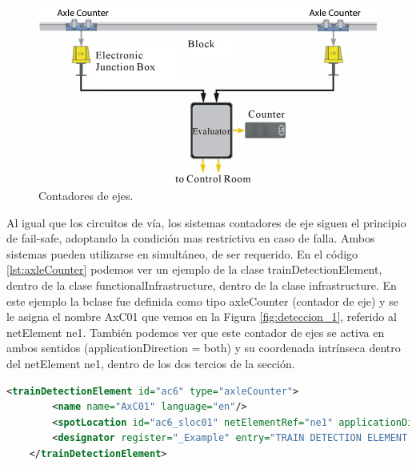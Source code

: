     \begin{figure}[H]
        \centering
        \includegraphics[width=1\textwidth]{Figuras/contador.jpg}
        \centering\caption{Contadores de ejes.}
        \label{fig:deteccion_2}
    \end{figure}

    Al igual que los circuitos de vía, los sistemas contadores de eje siguen el principio de fail-safe, adoptando la condición mas restrictiva en caso de falla. Ambos sistemas pueden utilizarse en simultáneo, de ser requerido. En el código \ref{lst:axleCounter} podemos ver un ejemplo de la clase trainDetectionElement, dentro de la clase functionalInfrastructure, dentro de la clase infrastructure. En este ejemplo la bclase fue definida como tipo axleCounter (contador de eje) y se le asigna el nombre AxC01 que vemos en la Figura \ref{fig:deteccion_1}, referido al netElement ne1. También podemos ver que este contador de ejes se activa en ambos sentidos (applicationDirection = both) y su coordenada intrínseca dentro del netElement ne1, dentro de los dos tercios de la sección.

    \begin{lstlisting}[language = XML, caption = Clase trainDetectionElement , label = {lst:axleCounter}]
    <trainDetectionElement id="ac6" type="axleCounter">
        <name name="AxC01" language="en"/>
        <spotLocation id="ac6_sloc01" netElementRef="ne1" applicationDirection="both" intrinsicCoord="0.6710"/>
        <designator register="_Example" entry="TRAIN DETECTION ELEMENT AxC01"/>
    </trainDetectionElement>
    \end{lstlisting}